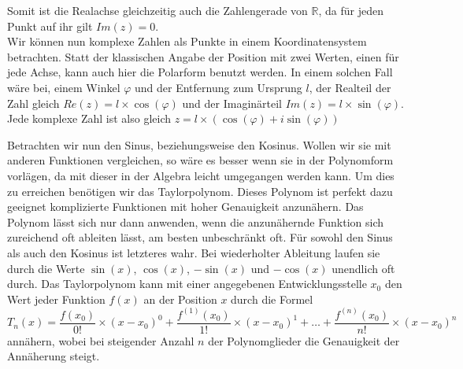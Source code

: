 \documentclass[a4paper,12pt]{article} %
\begin{document}
Somit ist die Realachse gleichzeitig auch die Zahlengerade von $\mathbb{R}$, da für jeden Punkt auf ihr gilt $Im(z)=0$.\\






 



Wir können nun komplexe Zahlen als Punkte in einem Koordinatensystem betrachten.
Statt der klassischen Angabe der Position mit zwei Werten, einen für jede Achse, kann auch hier die Polarform benutzt werden.
In einem solchen Fall wäre bei, einem Winkel $\varphi$ und der Entfernung zum Ursprung $l$, der Realteil der Zahl gleich $Re(z)=l\times\cos(\varphi)$ und der Imaginärteil $Im(z)=l\times\sin(\varphi)$.
Jede komplexe Zahl ist also gleich $z=l\times(\cos(\varphi)+i\sin(\varphi))$

Betrachten wir nun den Sinus, beziehungsweise den Kosinus.
Wollen wir sie mit anderen Funktionen vergleichen, so wäre es besser wenn sie in der Polynomform vorlägen, da mit dieser in der Algebra leicht umgegangen werden kann.
Um dies zu erreichen benötigen wir das Taylorpolynom.
Dieses Polynom ist perfekt dazu geeignet komplizierte Funktionen mit hoher Genauigkeit anzunähern.
Das Polynom lässt sich nur dann anwenden, wenn die anzunähernde Funktion sich zureichend oft ableiten lässt, am besten unbeschränkt oft.
Für sowohl den Sinus als auch den Kosinus ist letzteres wahr.
Bei wiederholter Ableitung laufen sie durch die Werte $\sin(x)$, $\cos(x)$, $-\sin(x)$ und $-\cos(x)$ unendlich oft durch.
Das Taylorpolynom kann mit einer angegebenen Entwicklungsstelle $x_0$ den Wert jeder Funktion $f(x)$ an der Position $x$ durch die Formel
\begin{equation}
	T_n(x)=\frac{f(x_0)}{0!}\times(x-x_0)^0 + \frac{f^{(1)}(x_0)}{1!}\times(x-x_0)^1 +%
	\dots +\frac{f^{(n)}(x_0)}{n!}\times(x-x_0)^n
\end{equation} %
annähern, wobei bei steigender Anzahl $n$ der Polynomglieder die Genauigkeit der Annäherung steigt.
\end{document}
